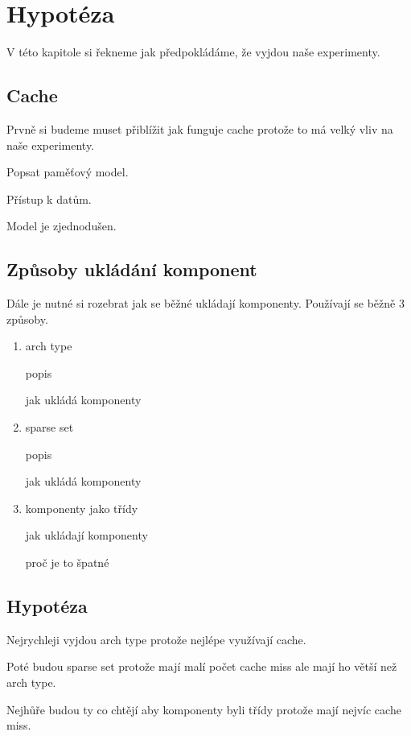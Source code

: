 \chapter{Hypotéza}
\label{chap:hypothesis}
V této kapitole si řekneme jak předpokládáme, že vyjdou naše experimenty.

\section{Cache}
Prvně si budeme muset přiblížit jak funguje cache protože to má velký vliv na naše experimenty.

Popsat paměťový model.

Přístup k datům.

Model je zjednodušen.

\section{Způsoby ukládání komponent}
\label{section:component-storage}
Dále je nutné si rozebrat jak se běžné ukládají komponenty. Používají se běžně 3 způsoby.

\begin{enumerate}
    \item arch type

    popis

    jak ukládá komponenty
    \item sparse set

    popis

    jak ukládá komponenty

    \item komponenty jako třídy

    jak ukládají komponenty

    proč je to špatné
\end{enumerate}

\section{Hypotéza}
Nejrychleji vyjdou arch type protože nejlépe využívají cache.

Poté budou sparse set protože mají malí počet cache miss ale mají ho větší než arch type.

Nejhůře budou ty co chtějí aby komponenty byli třídy protože mají nejvíc cache miss.



